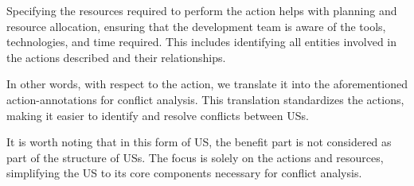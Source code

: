 \begin{definition}
\begin{itemize}
	Specifying the resources required to perform the action helps with planning and resource allocation, ensuring that the development team is aware of the tools, technologies, and time required. This includes identifying all entities involved in the actions described and their relationships.
	
	In other words, with respect to the action, we translate it into the aforementioned action-annotations for conflict analysis. This translation standardizes the actions, making it easier to identify and resolve conflicts between USs.
	
	It is worth noting that in this form of US, the benefit part is not considered as part of the structure of USs. The focus is solely on the actions and resources, simplifying the US to its core components necessary for conflict analysis.

\end{itemize}
\end{definition}
